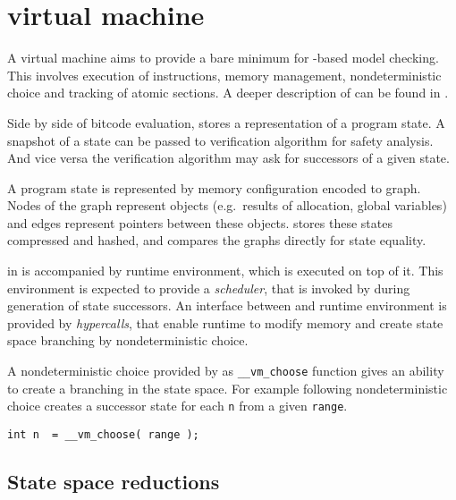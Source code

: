 \section{\DIVINE virtual machine}

A \DIVINE virtual machine aims to provide a bare minimum for \LLVM-based
model checking. This involves execution of instructions, memory management,
nondeterministic choice and tracking of atomic sections. A deeper description of
\DIVM can be found in \cite{RockaiCB17}.

Side by side of \LLVM bitcode evaluation, \DIVM stores a representation of a
program state. A snapshot of a state can be passed to verification algorithm
for safety analysis. And vice versa the verification algorithm may ask \DIVM for
successors of a given state.


A program state is represented by memory configuration encoded to graph.
Nodes of the graph represent objects (e.g.~results of allocation, global
variables) and edges represent pointers between these objects.
\DIVM stores these states compressed and hashed, and compares the graphs
directly for state equality.

\DIVM in \DIVINE is accompanied by runtime environment, which is executed on top
of it. This environment is expected to provide a \emph{scheduler}, that is invoked
by \DIVM during generation of state successors. An interface between \DIVM and
runtime environment is provided by \emph{hypercalls}, that enable runtime to modify
memory and create state space branching by nondeterministic choice.

\begin{example}
A nondeterministic choice provided by \DIVM as \texttt{\_\_vm\_choose} function
gives an ability to create a branching in the state space. For example following nondeterministic
choice creates a successor state for each \texttt{n} from a given \texttt{range}.

\begin{verbatim}
int n  = __vm_choose( range );
\end{verbatim}

\end{example}
\subsection{State space reductions}

